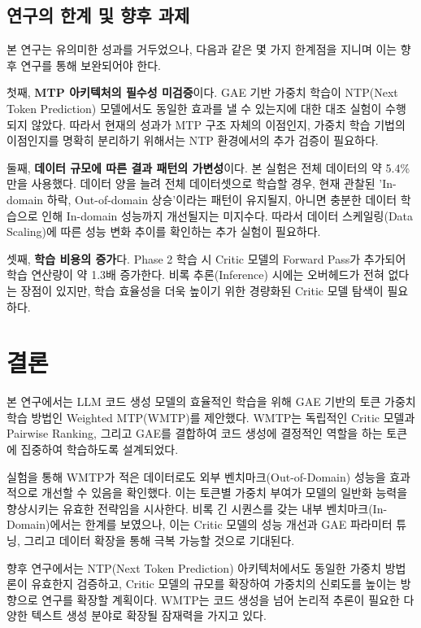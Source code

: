 \documentclass[11pt,a4paper]{article}
\begin{document}
\subsection{연구의 한계 및 향후 과제}
본 연구는 유의미한 성과를 거두었으나, 다음과 같은 몇 가지 한계점을 지니며 이는 향후 연구를 통해 보완되어야 한다.

첫째, \textbf{MTP 아키텍처의 필수성 미검증}이다. GAE 기반 가중치 학습이 NTP(Next Token Prediction) 모델에서도 동일한 효과를 낼 수 있는지에 대한 대조 실험이 수행되지 않았다. 따라서 현재의 성과가 MTP 구조 자체의 이점인지, 가중치 학습 기법의 이점인지를 명확히 분리하기 위해서는 NTP 환경에서의 추가 검증이 필요하다.

둘째, \textbf{데이터 규모에 따른 결과 패턴의 가변성}이다. 본 실험은 전체 데이터의 약 5.4\%만을 사용했다. 데이터 양을 늘려 전체 데이터셋으로 학습할 경우, 현재 관찰된 'In-domain 하락, Out-of-domain 상승'이라는 패턴이 유지될지, 아니면 충분한 데이터 학습으로 인해 In-domain 성능까지 개선될지는 미지수다. 따라서 데이터 스케일링(Data Scaling)에 따른 성능 변화 추이를 확인하는 추가 실험이 필요하다.

셋째, \textbf{학습 비용의 증가}다. Phase 2 학습 시 Critic 모델의 Forward Pass가 추가되어 학습 연산량이 약 1.3배 증가한다. 비록 추론(Inference) 시에는 오버헤드가 전혀 없다는 장점이 있지만, 학습 효율성을 더욱 높이기 위한 경량화된 Critic 모델 탐색이 필요하다.

\section{결론}

본 연구에서는 LLM 코드 생성 모델의 효율적인 학습을 위해 GAE 기반의 토큰 가중치 학습 방법인 Weighted MTP(WMTP)를 제안했다. WMTP는 독립적인 Critic 모델과 Pairwise Ranking, 그리고 GAE를 결합하여 코드 생성에 결정적인 역할을 하는 토큰에 집중하여 학습하도록 설계되었다.

실험을 통해 WMTP가 적은 데이터로도 외부 벤치마크(Out-of-Domain) 성능을 효과적으로 개선할 수 있음을 확인했다. 이는 토큰별 가중치 부여가 모델의 일반화 능력을 향상시키는 유효한 전략임을 시사한다. 비록 긴 시퀀스를 갖는 내부 벤치마크(In-Domain)에서는 한계를 보였으나, 이는 Critic 모델의 성능 개선과 GAE 파라미터 튜닝, 그리고 데이터 확장을 통해 극복 가능할 것으로 기대된다.

향후 연구에서는 NTP(Next Token Prediction) 아키텍처에서도 동일한 가중치 방법론이 유효한지 검증하고, Critic 모델의 규모를 확장하여 가중치의 신뢰도를 높이는 방향으로 연구를 확장할 계획이다. WMTP는 코드 생성을 넘어 논리적 추론이 필요한 다양한 텍스트 생성 분야로 확장될 잠재력을 가지고 있다.
\end{document}
